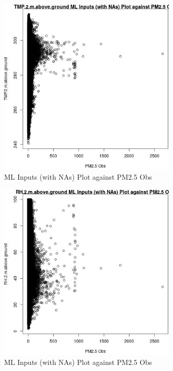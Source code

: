 \begin{figure} 
\centering  
\includegraphics[width=0.77\textwidth]{Code_Outputs/Report_ML_input_PM25_Step4_part_e_de_duplicated_aves_compiled_2019-05-21wNAs_TMP2mabovegroundvPM25_Obs.jpg} 
\caption{\label{fig:Report_ML_input_PM25_Step4_part_e_de_duplicated_aves_compiled_2019-05-21wNAsTMP2mabovegroundvPM25_Obs}ML Inputs (with NAs) Plot against PM2.5 Obs} 
\end{figure} 
 

\begin{figure} 
\centering  
\includegraphics[width=0.77\textwidth]{Code_Outputs/Report_ML_input_PM25_Step4_part_e_de_duplicated_aves_compiled_2019-05-21wNAs_RH2mabovegroundvPM25_Obs.jpg} 
\caption{\label{fig:Report_ML_input_PM25_Step4_part_e_de_duplicated_aves_compiled_2019-05-21wNAsRH2mabovegroundvPM25_Obs}ML Inputs (with NAs) Plot against PM2.5 Obs} 
\end{figure} 
 

